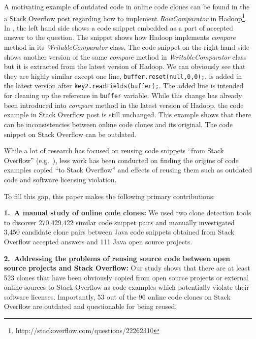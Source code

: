 \documentclass{sig-alternate-05-2015}
\begin{document}
A motivating example of outdated code in online code clones can be found in the a Stack Overflow post regarding how to implement \textit{RawComparator} in Hadoop\footnote{http://stackoverflow.com/questions/22262310}. In , the left hand side shows a code snippet embedded as a part of accepted answer to the question. The snippet shows how Hadoop implements \textit{compare} method in its \textit{WritableComparator} class. The code snippet on the right hand side shows another version of the same \textit{compare} method in \textit{WritableComparator} class but it is extracted from the latest version of Hadoop. We can obviously see that they are highly similar except one line, \verb|buffer.reset(null,0,0);|, is added in the latest version after \verb|key2.readFields(buffer);|. The added line is intended for cleaning up the reference in \verb|buffer| variable. While this change has already been introduced into \textit{compare} method in the latest version of Hadoop, the code example in Stack Overflow post is still unchanged. This example shows that there can be inconsistencies between online code clones and its original. The code snippet on Stack Overflow can be outdated.  %

While a lot of research has focused on reusing code snippets ``from Stack Overflow'' (e.g.~\cite{Keivanloo2014,An2017,Yang2016}), less work has been conducted on finding the origins of code examples copied ``to Stack Overflow'' and effects of reusing them such as outdated code and software licensing violation.

To fill this gap, this paper makes the following  primary contributions:

\vspace{0.5ex}%
\noindent\textbf{1.~A manual study of online code clones:} 
We used two clone detection tools to discover 270,429,422 similar code snippet pairs and manually investigated 3,450 candidate clone pairs between Java code snippets obtained from Stack Overflow accepted answers and 111 Java open source projects.

\vspace{0.5ex}%
\noindent\textbf{2.~Addressing the problems of reusing source code between open source projects and Stack Overflow:} Our study shows that there are at least 523 clones that have been obviously copied from open source projects or external online sources to Stack Overflow as code examples which potentially violate their software licenses. Importantly, 53 out of the 96 online code clones on Stack Overflow are outdated and questionable for being reused.
\end{document}
